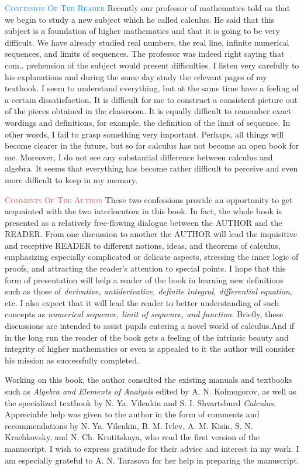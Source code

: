 \textcolor{DodgerBlue}{\textsc{Confession Of The Reader}} Recently our professor of mathematics told us that we begin to study a new subject which he called calculus. He said that this subject is a foundation of higher mathematics and that it is going to be very difficult. We have already studied real numbers, the real line, infinite numerical sequences, and limits of sequences. The professor was indeed right saying that com.. prehension of the subject would present difficulties. I listen very carefully to his explanations and during the same day study the relevant pages of my textbook. I seem to understand everything, but at the same time have a feeling of a certain dissatisfaction. It is difficult for me to construct a consistent picture out of the pieces obtained in the classroom. It is equally difficult to remember exact wordings and definitions, for example, the definition of the limit of sequence. In other words, I fail to grasp something very important.
Perhaps, all things will become clearer in the future, but so far calculus has not become an open book for me. Moreover, I do not see any substantial difference between calculus and algebra. It seems that everything has become rather difficult to perceive and even more difficult to keep in my memory.

\textcolor{IndianRed}{\textsc{Comments Of The Author}} These two confessions provide an opportunity to get acquainted with the two interlocutors in this book. In fact, the whole book is presented as a relatively free-flowing dialogue between the AUTHOR and the READER. From one discussion to another the AUTHOR will lead the inquisitive and receptive READER to different notions, ideas, and theorems of calculus, emphasizing especially complicated or delicate aspects, stressing the inner logic of proofs, and attracting the reader's attention to special points. I hope that this form of presentation will help a reader of the book in learning new definitions such as those of \emph{derivative, antiderivative, definite integral, differential equation}, etc. I also expect that it will lead the reader to better understanding of such concepts as \emph{numerical sequence, limit of sequence, and function}. Briefly, these discussions are intended to assist pupils entering a novel world of calculus.And if in the long run the reader of the book gets a feeling of the intrinsic beauty and integrity of higher mathematics or even is appealed to it the author will consider his mission as successfully completed.	

Working on this book, the author consulted the existing manuals and textbooks such as \emph{Algebra and Elements of Analysis} edited by A. N. Kolmogorov, as well as the specialized textbook by N. Ya. Vilenkin and S. I. Shvartsburd \emph{Calculus}. Appreciable help was given to the author in the form of comments and recommendations by N. Ya. Vilenkin, B. M. Ivlev, A. M. Kisin, S. N. Krachkovsky, and N. Ch. Krutitskaya, who read the first version of the manuscript. I wish to express gratitude for their advice and interest in my work. I am especially grateful to A. N. Tarasova for her help in preparing the manuscript.
